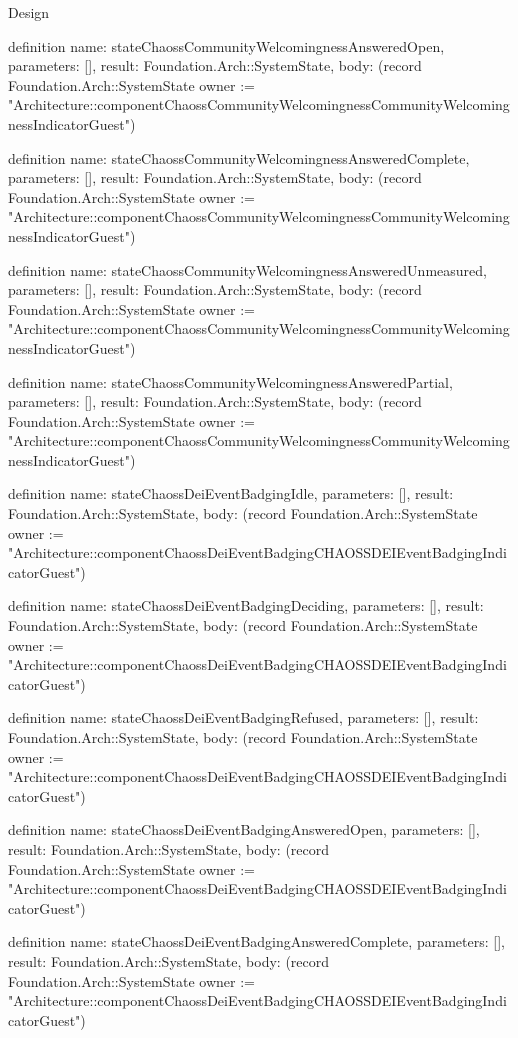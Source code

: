 \begin{lexlean}{Design}
\begin{semanticmodule}
definition{
  name: stateChaossCommunityWelcomingnessAnsweredOpen,
  parameters: [],
  result: Foundation.Arch::SystemState,
  body: (record Foundation.Arch::SystemState {owner := "Architecture::componentChaossCommunityWelcomingnessCommunityWelcomingnessIndicatorGuest"})
}

definition{
  name: stateChaossCommunityWelcomingnessAnsweredComplete,
  parameters: [],
  result: Foundation.Arch::SystemState,
  body: (record Foundation.Arch::SystemState {owner := "Architecture::componentChaossCommunityWelcomingnessCommunityWelcomingnessIndicatorGuest"})
}

definition{
  name: stateChaossCommunityWelcomingnessAnsweredUnmeasured,
  parameters: [],
  result: Foundation.Arch::SystemState,
  body: (record Foundation.Arch::SystemState {owner := "Architecture::componentChaossCommunityWelcomingnessCommunityWelcomingnessIndicatorGuest"})
}

definition{
  name: stateChaossCommunityWelcomingnessAnsweredPartial,
  parameters: [],
  result: Foundation.Arch::SystemState,
  body: (record Foundation.Arch::SystemState {owner := "Architecture::componentChaossCommunityWelcomingnessCommunityWelcomingnessIndicatorGuest"})
}

definition{
  name: stateChaossDeiEventBadgingIdle,
  parameters: [],
  result: Foundation.Arch::SystemState,
  body: (record Foundation.Arch::SystemState {owner := "Architecture::componentChaossDeiEventBadgingCHAOSSDEIEventBadgingIndicatorGuest"})
}

definition{
  name: stateChaossDeiEventBadgingDeciding,
  parameters: [],
  result: Foundation.Arch::SystemState,
  body: (record Foundation.Arch::SystemState {owner := "Architecture::componentChaossDeiEventBadgingCHAOSSDEIEventBadgingIndicatorGuest"})
}

definition{
  name: stateChaossDeiEventBadgingRefused,
  parameters: [],
  result: Foundation.Arch::SystemState,
  body: (record Foundation.Arch::SystemState {owner := "Architecture::componentChaossDeiEventBadgingCHAOSSDEIEventBadgingIndicatorGuest"})
}

definition{
  name: stateChaossDeiEventBadgingAnsweredOpen,
  parameters: [],
  result: Foundation.Arch::SystemState,
  body: (record Foundation.Arch::SystemState {owner := "Architecture::componentChaossDeiEventBadgingCHAOSSDEIEventBadgingIndicatorGuest"})
}

definition{
  name: stateChaossDeiEventBadgingAnsweredComplete,
  parameters: [],
  result: Foundation.Arch::SystemState,
  body: (record Foundation.Arch::SystemState {owner := "Architecture::componentChaossDeiEventBadgingCHAOSSDEIEventBadgingIndicatorGuest"})
}


\end{semanticmodule}
\end{lexlean}
